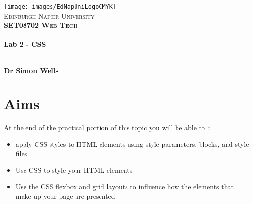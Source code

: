 \documentclass[10pt, a4paper, twosize]{article}
\begin{document}

\begin{titlepage}
\vspace*{5cm}
\begin{center}
\texttt{[image: images/EdNapUniLogoCMYK]}~\\[1cm]

\textsc{\Large Edinburgh Napier University}\\[1.5cm]

\textsc{\LARGE \bfseries SET08702 Web Tech}\\[0.5cm]

\hrulefill \\[0.4cm]
{\huge \bfseries Lab 2 - CSS \\[0.4cm] }
\hrulefill \\[1.5cm]

\begin{minipage}{0.4\textwidth}
\begin{flushleft} \large
\textbf{Dr Simon Wells} \\
\end{flushleft}
\end{minipage}

\vfill

\end{center}
\end{titlepage}




%

\section*{Aims}
\paragraph{} At the end of the practical portion of this topic you will be able to ::

\begin{itemize}
    \item apply CSS styles to HTML elements using style parameters, blocks, and style files
    \item Use CSS to style your HTML elements
    \item Use the CSS flexbox and grid layouts to influence how the elements that make up your page are presented
\end{itemize}
\end{document}
